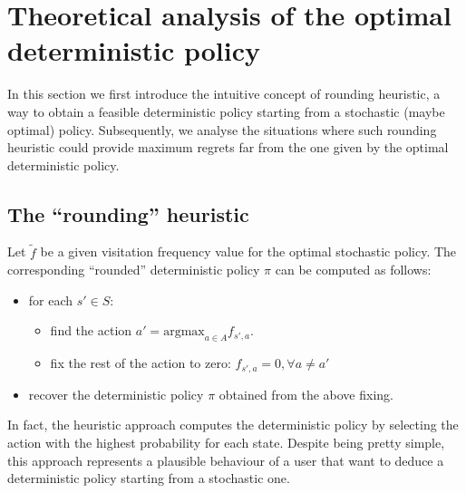 \section{Theoretical analysis of the optimal deterministic policy}

In this section we first introduce the intuitive concept of rounding heuristic, a way to obtain a feasible deterministic policy starting from a stochastic (maybe optimal) policy. Subsequently, we analyse the situations where such rounding heuristic could provide maximum regrets far from the one given by the optimal deterministic policy.

\subsection{The ``rounding'' heuristic}

Let $\tilde{f}$ be a given visitation frequency value for the optimal stochastic policy. The corresponding ``rounded'' deterministic policy $\pi$ can be computed as follows:

\begin{itemize}
\item for each $s'\in S$:
\begin{itemize}
\item find the action $a' = \text{argmax}_{a \in A}f_{s',a}$.
\item fix the rest of the action to zero: $f_{s',a} =0, \forall a \neq a'$
\end{itemize}
\item recover the deterministic policy $\pi$ obtained from the above fixing.
\end{itemize}
 
In fact, the heuristic approach computes the deterministic policy by selecting the action with the highest probability for each state. Despite being pretty simple, this approach represents a plausible behaviour of a user that want to deduce a deterministic policy starting from a stochastic one.  
%
%
%
%
%
